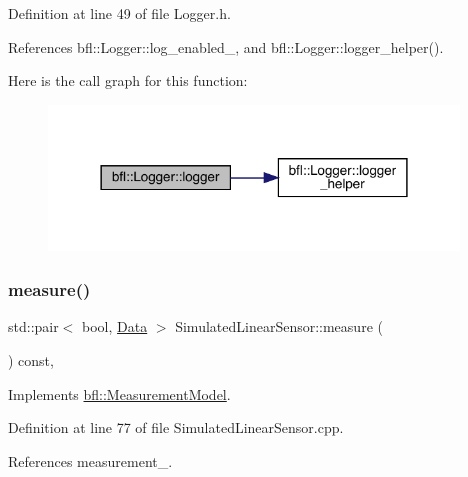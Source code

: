 Definition at line 49 of file Logger.\+h.



References bfl\+::\+Logger\+::log\+\_\+enabled\+\_\+, and bfl\+::\+Logger\+::logger\+\_\+helper().

Here is the call graph for this function\+:
\nopagebreak
\begin{figure}[H]
\begin{center}
\leavevmode
\includegraphics[width=309pt]{classbfl_1_1Logger_a0f0cf7ce956546d94dfb1feb7cebf171_cgraph}
\end{center}
\end{figure}
\mbox{\label{classbfl_1_1SimulatedLinearSensor_a61c278bdbc5f3a0201d2f855a739d4f4}} 
\subsubsection{\texorpdfstring{measure()}{measure()}}
{\footnotesize\ttfamily std\+::pair$<$ bool, \mbox{\hyperlink{namespacebfl_af6b103c6821db1b54452f776fdd9dd02}{Data}} $>$ Simulated\+Linear\+Sensor\+::measure (\begin{DoxyParamCaption}{ }\end{DoxyParamCaption}) const\hspace{0.3cm}{\ttfamily [override]}, {\ttfamily [virtual]}}



Implements \mbox{\hyperlink{classbfl_1_1MeasurementModel_ad372b720cef4e6bc0ac2489f4098bfc9}{bfl\+::\+Measurement\+Model}}.



Definition at line 77 of file Simulated\+Linear\+Sensor.\+cpp.



References measurement\+\_\+.

\mbox{\label{classbfl_1_1LinearMeasurementModel_a8831b8acb4790db4c69db73200375c69}} 

